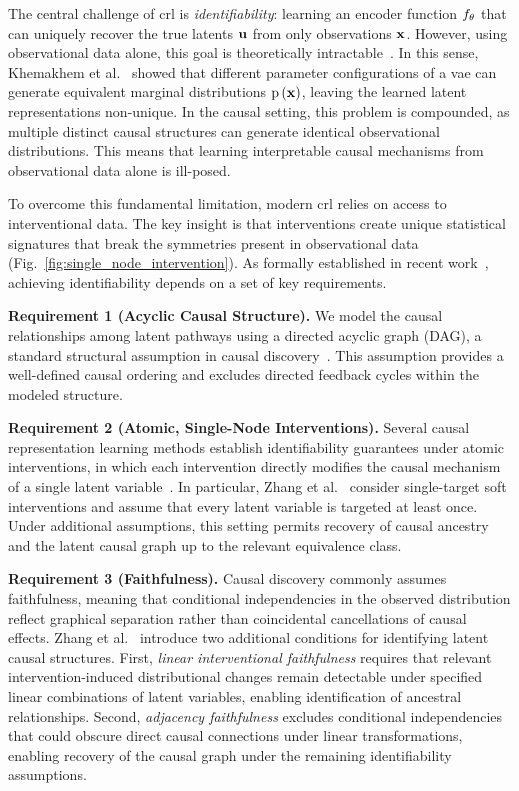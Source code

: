 The central challenge of \gls{crl} is \emph{identifiability}: learning an encoder function $f_\theta$ that can uniquely recover the true latents ${\mathbf{u}}$ from only observations ${\mathbf{x}}$.
However, using observational data alone, this goal is theoretically intractable~\cite{pearl2009causality}.
In this sense, Khemakhem et al.~\cite{khemakhem2020variational} showed that different parameter configurations of a \gls{vae} can generate equivalent marginal distributions $\operatorname{p}\left({\mathbf{x}}\right)$, leaving the learned latent representations non-unique.
In the causal setting, this problem is compounded, as multiple distinct causal structures can generate identical observational distributions.
This means that learning interpretable causal mechanisms from observational data alone is ill-posed.

To overcome this fundamental limitation, modern \gls{crl} relies on access to interventional data.
The key insight is that interventions create unique statistical signatures that break the symmetries present in observational data (Fig.~\ref{fig:single_node_intervention}).
As formally established in recent work~\cite{scholkopf2021toward}, achieving identifiability depends on a set of key requirements.

\textbf{Requirement 1 (Acyclic Causal Structure).}
We model the causal relationships among latent pathways using a directed acyclic graph (DAG), a standard structural assumption in causal discovery~\cite{pearl2009causality}.
This assumption provides a well-defined causal ordering and excludes directed feedback cycles within the modeled structure.

\textbf{Requirement 2 (Atomic, Single-Node Interventions).}
Several causal representation learning methods establish identifiability guarantees under atomic interventions, in which each intervention directly modifies the causal mechanism of a single latent variable~\cite{zhang2023identifiability,von2023nonparametric}.
In particular, Zhang et al.~\cite{zhang2023identifiability} consider single-target soft interventions and assume that every latent variable is targeted at least once.
Under additional assumptions, this setting permits recovery of causal ancestry and the latent causal graph up to the relevant equivalence class.

\textbf{Requirement 3 (Faithfulness).}
Causal discovery commonly assumes faithfulness, meaning that conditional independencies in the observed distribution reflect graphical separation rather than coincidental cancellations of causal effects.
Zhang et al.~\cite{zhang2023identifiability} introduce two additional conditions for identifying latent causal structures.
First, \emph{linear interventional faithfulness} requires that relevant intervention-induced distributional changes remain detectable under specified linear combinations of latent variables, enabling identification of ancestral relationships.
Second, \emph{adjacency faithfulness} excludes conditional independencies that could obscure direct causal connections under linear transformations, enabling recovery of the causal graph under the remaining identifiability assumptions.


